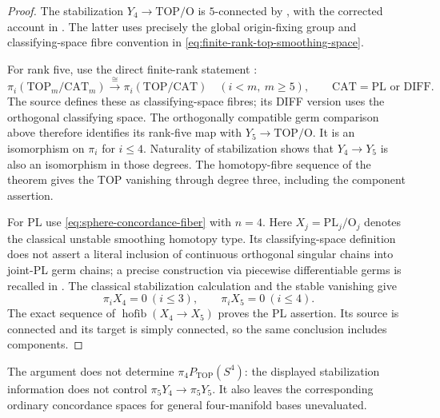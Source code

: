 \begin{proof}
The stabilization $Y_4\to\mathrm{TOP}/\mathrm O$ is
$5$-connected by
\cite[Theorem~8.7A, p.~128]{FreedmanQuinn1990}, with the
corrected account in
\cite[Section~1.1, Theorem~1.3 and the following paragraph,
p.~2]{GabaiGayHartmanKrushkalPowell2026}.
The latter uses precisely the global origin-fixing group and
classifying-space fibre convention in
\eqref{eq:finite-rank-top-smoothing-space}.

For rank five, use the direct finite-rank statement
\cite[Annex~C, Theorem~5.3, p.~317]{KirbySiebenmann1977}:
\[
 \pi_i(\mathrm{TOP}_m/\mathrm{CAT}_m)
       \xrightarrow{\cong}\pi_i(\mathrm{TOP}/\mathrm{CAT})
       \quad(i<m,\ m\geq5),
       \qquad \mathrm{CAT}=\mathrm{PL}\text{ or }\mathrm{DIFF}.
\]
The source defines these as classifying-space fibres; its DIFF
version uses the orthogonal classifying space.  The orthogonally compatible germ
comparison above therefore identifies its rank-five map with
$Y_5\to\mathrm{TOP}/\mathrm O$.  It is an isomorphism on
$\pi_i$ for $i\leq4$.  Naturality of stabilization shows that
$Y_4\to Y_5$ is also an isomorphism in those degrees.  The
homotopy-fibre sequence of the theorem gives the TOP vanishing
through degree three, including the component assertion.

For PL use \eqref{eq:sphere-concordance-fiber} with $n=4$.
Here $X_j=\mathrm{PL}_j/\mathrm O_j$ denotes the classical
unstable smoothing homotopy type.  Its classifying-space
definition does not assert a literal inclusion of continuous
orthogonal singular chains into joint-PL germ chains; a precise
construction via piecewise differentiable germs is recalled in
\cite[Section~3.4, Remark~3.7 and footnote~16, p.~16]
{SalvatoreTurchin2026}.  The classical stabilization calculation
\cite[Section~5, formula~(3), p.~37]{BurgheleaLashof1974II}
and the stable vanishing
\cite[Annex~C, p.~318]{KirbySiebenmann1977} give
\[
              \pi_iX_4=0\ (i\leq3),\qquad
              \pi_iX_5=0\ (i\leq4).
\]
The exact sequence of $\operatorname{hofib}(X_4\to X_5)$
proves the PL assertion.  Its source is connected and its
target is simply connected, so the same conclusion includes
components.
\end{proof}

The argument does not determine $\pi_4P_{\mathrm{TOP}}(S^4)$:
the displayed stabilization information does not control
$\pi_5Y_4\to\pi_5Y_5$.  It also leaves the corresponding
ordinary concordance spaces for general four-manifold bases
unevaluated.
